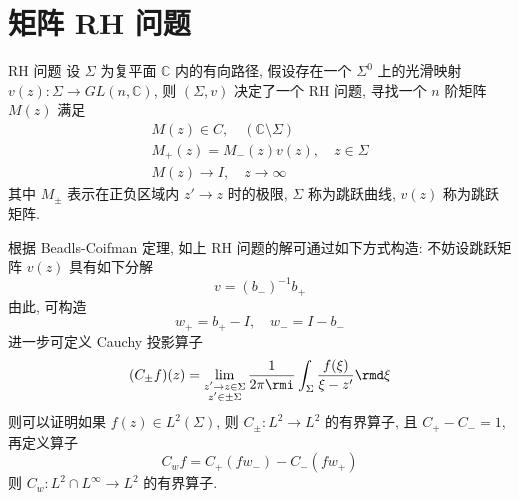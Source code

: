 \section{矩阵 RH 问题}
\begin{definition}{RH 问题}
    设 $ \Sigma $ 为复平面 $ \mathbb{C} $ 内的有向路径, 假设存在一个 $ {\Sigma} ^{0} $ 上的光滑映射 $ v(z) : \Sigma \to GL(n,\mathbb{C}) $, 则 $ (\Sigma, v) $ 决定了一个 RH 问题, 寻找一个 $ n $ 阶矩阵 $ M(z) $ 满足
    \begin{align}
        M(z) \in C, \quad ( \mathbb{C}\setminus  \Sigma ) \label{ch1-eq-RH-analytical-condition} \\
        M_{+}(z) = M_{-}(z)v(z), \quad z\in \Sigma \label{ch1-eq-RH-Matrix-jump-condition}       \\
        M(z) \to I ,\quad z \to \infty \label{ch1-eq-RH-Matrix-asymptotic-condition}
    \end{align}
    其中 $ M_{\pm} $ 表示在正负区域内 $ z' \to z $ 时的极限, $ \Sigma $ 称为跳跃曲线, $ v(z) $ 称为跳跃矩阵.
\end{definition}

根据 Beadls-Coifman 定理, 如上 RH 问题的解可通过如下方式构造: 不妨设跳跃矩阵 $ v(z) $ 具有如下分解
\begin{equation}
    v = (b_{-})^{-1}b_{+}
\end{equation}
由此, 可构造
\begin{equation}
    w_{+} = b_{+} - I, \quad w_{-} = I - b_{-}
\end{equation}
进一步可定义 Cauchy 投影算子
\begin{equation}
    (C_{\pm} f)(z) = \lim_{\substack{z' \to z \in \Sigma \\ z' \in \pm \Sigma}} \frac{1}{2 \pi \rmi} \int_{\Sigma} \frac{f(\xi)}{\xi - z'} \rmd \xi \label{ch1-eq-Cauchy-projection}
\end{equation}
则可以证明如果 $ f(z) \in L^{2}(\Sigma) $, 则 $ C_{\pm} : L^{2} \to L^{2} $ 的有界算子, 且 $ C_{+} - C_{-} = 1 $, 再定义算子
\begin{equation}
    C_{w}f = C_{+}(fw_{-}) - C_{-}(fw_{+}) \label{ch1-eq-Cauchy-projection-operator}
\end{equation}
则 $ C_{w}: L^{2} \cap L^{\infty} \to L^2 $ 的有界算子.


